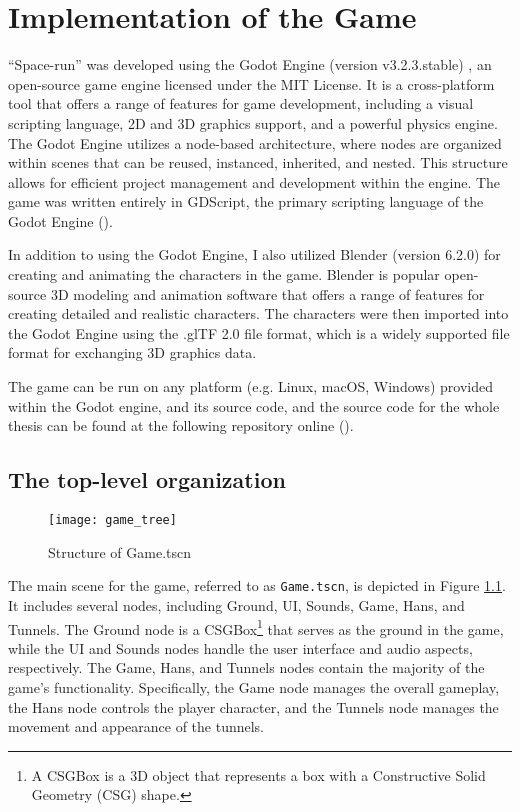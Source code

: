 \chapter{Implementation of the Game}
``Space-run'' was developed using the Godot Engine (version v3.2.3.stable) , an open-source game engine licensed under the MIT License. It is a cross-platform tool that offers a range of features for game development, including a visual scripting language, 2D and 3D graphics support, and a powerful physics engine. The Godot Engine utilizes a node-based architecture, where nodes are organized within scenes that can be reused, instanced, inherited, and nested. This structure allows for efficient project management and development within the engine. The game was written entirely in GDScript, the primary scripting language of the Godot Engine (\cite{GodotDocs}).

In addition to using the Godot Engine, I also utilized Blender (version 6.2.0) \cite{blender} for creating and animating the characters in the game. Blender is popular open-source 3D modeling and animation software that offers a range of features for creating detailed and realistic characters. The characters were then imported into the Godot Engine using the .glTF 2.0 \cite{gltf} file format, which is a widely supported file format for exchanging 3D graphics data.

The game can be run on any platform (e.g. Linux, macOS, Windows) provided within the Godot engine, and its source code, and the source code for the whole thesis can be found at the following repository online (\cite{spacerunai}).

\section{The top-level organization}
\begin{figure}[h]
    \centering
    \texttt{[image: game\_tree]}
    \caption{Structure of Game.tscn}
    \label{fig:game_tree}
\end{figure}

The main scene for the game, referred to as \texttt{Game.tscn}, is depicted in Figure \ref{fig:game_tree}. It includes several nodes, including Ground, UI, Sounds, Game, Hans, and Tunnels. The Ground node is a CSGBox\footnote{A CSGBox is a 3D object that represents a box with a Constructive Solid Geometry (CSG) shape.} that serves as the ground in the game, while the UI and Sounds nodes handle the user interface and audio aspects, respectively. The Game, Hans, and Tunnels nodes contain the majority of the game's functionality. Specifically, the Game node manages the overall gameplay, the Hans node controls the player character, and the Tunnels node manages the movement and appearance of the tunnels.

